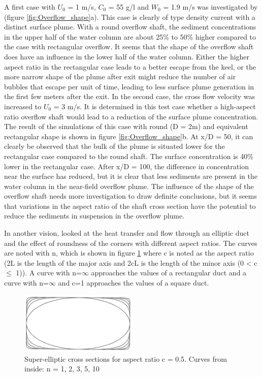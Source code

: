 \noindent A first case with $U_0$ = 1 m/s, $C_0$ = 55 g/l and $W_0$ = 1.9 m/s was investigated by \cite{Decrop}(figure \ref{fig:Overflow_shape}a). This case is clearly of type density current with a distinct surface plume. With a round overflow shaft, the sediment concentrations in the upper half of the water column are about 25\% to 50\% higher compared to the case with rectangular overflow. It seems that the shape of the overflow shaft does have an influence in the lower half of the water column. Either the higher aspect ratio in the rectangular case leads to a better escape from the keel, or the more narrow shape of the plume after exit might reduce the number of air bubbles that escape per unit of time, leading to less surface plume generation in the first few meters after the exit.\newline
\noindent In the second case, the cross flow velocity was increased to $U_0$ = 3 m/s. It is determined in this test case whether a high-aspect ratio overflow shaft would lead to a reduction of the surface plume concentration. The result of the simulations of this case with round (D = 2m) and equivalent rectangular shape is shown in figure \ref{fig:Overflow_shape}b. At x/D = 50, it can clearly be observed that the bulk of the plume is situated lower for the rectangular case compared to the round shaft. The surface concentration is 40\% lower in the rectangular case. After x/D = 100, the difference in concentration near the surface has reduced, but it is clear that less sediments are present in the water column in the near-field overflow plume.\newline
\noindent The influence of the shape of the overflow shaft needs more investigation to draw definite conclusions, but it seems that variations in the aspect ratio of the shaft cross section have the potential to reduce the sediments in suspension in the overflow plume. \newline

\noindent In another vision, \cite{Wang} looked at the heat transfer and flow through an elliptic duct and the effect of roundness of the corners with different aspect ratios. The curves are noted with n, which is shown in figure \ref{fig:elliptic_shapes} where c is noted as the aspect ratio (2L is the length of the major axis and 2cL is the length of the minor axis (0 < c $\leq$ 1)). A curve with n=$\infty$ approaches the values of a rectangular duct and a curve with n=$\infty$ and c=1 approaches the values of a square duct.

\begin{figure}[ht!]
    \centering
    \includegraphics[width=0.5\textwidth]{Images/Elliptic_shapes.png}
    \caption{Super-elliptic cross sections for aspect ratio c = 0.5. Curves from inside: n = 1, 2, 3, 5, 10}
    \label{fig:elliptic_shapes}
\end{figure}

